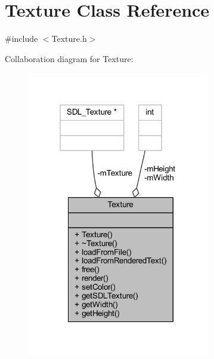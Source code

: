 \hypertarget{class_texture}{}\section{Texture Class Reference}
\label{class_texture}


{\ttfamily \#include $<$Texture.\+h$>$}



Collaboration diagram for Texture\+:\nopagebreak
\begin{figure}[H]
\begin{center}
\leavevmode
\includegraphics[width=226pt]{class_texture__coll__graph}
\end{center}
\end{figure}
